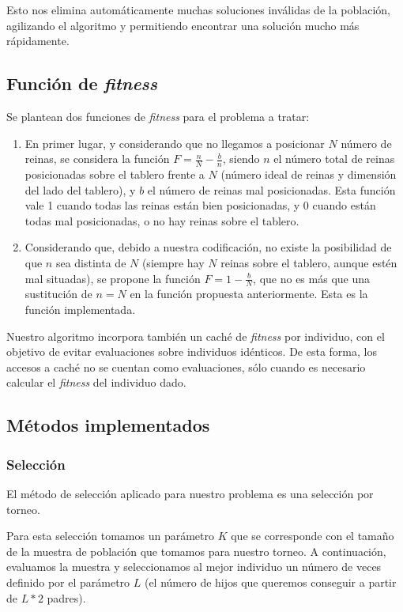 \documentclass[12pt]{article}
\begin{document}
Esto nos elimina automáticamente muchas soluciones inválidas de la población, agilizando el algoritmo y permitiendo encontrar una solución mucho más rápidamente.

\subsection{Función de \emph{fitness}}

Se plantean dos funciones de \emph{fitness} para el problema a tratar:

\begin{enumerate}
    \item En primer lugar, y considerando que no llegamos a posicionar $N$ número de reinas, se considera la función $F=\frac{n}{N} - \frac{b}{n}$, siendo $n$ el número total de reinas posicionadas sobre el tablero frente a $N$ (número ideal de reinas y dimensión del lado del tablero), y $b$ el número de reinas mal posicionadas. Esta función vale 1 cuando todas las reinas están bien posicionadas, y 0 cuando están todas mal posicionadas, o no hay reinas sobre el tablero.
    \item Considerando que, debido a nuestra codificación, no existe la posibilidad de que $n$ sea distinta de $N$ (siempre hay $N$ reinas sobre el tablero, aunque estén mal situadas), se propone la función $F=1-\frac{b}{N}$, que no es más que una sustitución de $n=N$ en la función propuesta anteriormente. Esta es la función implementada.
\end{enumerate}

Nuestro algoritmo incorpora también un caché de \emph{fitness} por individuo, con el objetivo de evitar evaluaciones sobre individuos idénticos. De esta forma, los accesos a caché no se cuentan como evaluaciones, sólo cuando es necesario calcular el \emph{fitness} del individuo dado.

\subsection{Métodos implementados}

\subsubsection{Selección}

El método de selección aplicado para nuestro problema es una selección por torneo.

Para esta selección tomamos un parámetro $K$ que se corresponde con el tamaño de la muestra de población que tomamos para nuestro torneo. A continuación, evaluamos la muestra y seleccionamos al mejor individuo un número de veces definido por el parámetro $L$ (el número de hijos que queremos conseguir a partir de $L*2$ padres).
\end{document}
